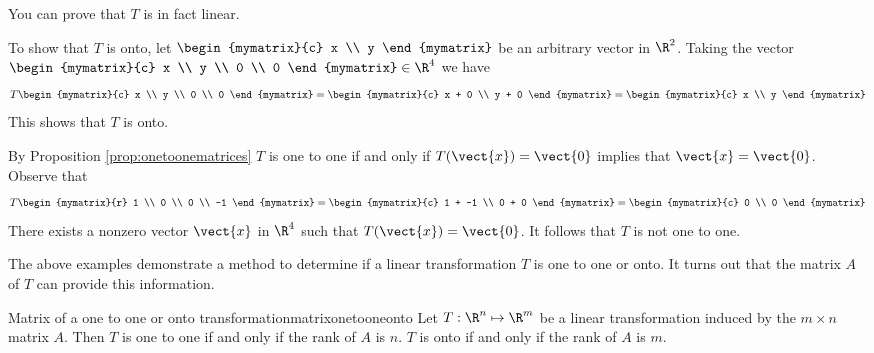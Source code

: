 \begin{solution} 
You can prove that $T$ is in fact linear. 

To show that $T$ is onto, let $\begin{mymatrix}{c} 
x \\
y
\end{mymatrix}$ be an arbitrary vector in $\R^2$. Taking the vector $\begin{mymatrix}{c}
x \\
y \\
0 \\
0 
\end{mymatrix} \in \R^4$ we have 
\[
T \begin{mymatrix}{c}
x \\
y \\
0 \\
0
\end{mymatrix} = 
\begin{mymatrix}{c}
x + 0 \\
y + 0 
\end{mymatrix}
= \begin{mymatrix}{c}
x \\
y 
\end{mymatrix}
\]
This shows that $T$ is onto. 

By Proposition \ref{prop:onetoonematrices} $T$ is one to one if and only if $T(\vect{x}) = \vect{0}$ implies that $\vect{x} = \vect{0}$. Observe that 
\[
T \begin{mymatrix}{r}
1 \\
0 \\
0 \\
-1
\end{mymatrix} = 
\begin{mymatrix}{c}
1 + -1 \\
0 + 0 
\end{mymatrix}
= \begin{mymatrix}{c}
0 \\
0 
\end{mymatrix}
\]
There exists a nonzero vector $\vect{x}$ in $\R^4$ such that $T(\vect{x}) = \vect{0}$. It follows that $T$ is not one to one.
\end{solution}

The above examples demonstrate a method to determine if a linear transformation $T$ is one to one or onto. It turns out that the matrix $A$ of $T$ can provide this information.

\begin{theorem}{Matrix of a one to one or onto transformation}{matrixonetooneonto}
Let $T: \R^n \mapsto \R^m$ be a linear transformation induced by the $m \times n$ matrix $A$. Then $T$ is one to one if and only if the rank of $A$ is $n$. $T$ is onto if and only if the rank of $A$ is $m$. 
\end{theorem}

